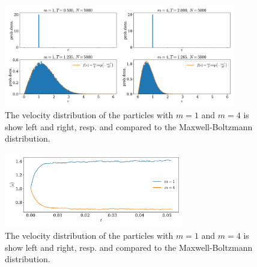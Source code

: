 \documentclass{article}
\begin{document}
            \begin{figure}
                \centering
                \includegraphics[width=0.9\textwidth]{../plots/problem2/vel_dist.pdf}
                \caption{The velocity distribution of the particles with $m=1$ and $m=4$ is show left and right, resp. and compared to the Maxwell-Boltzmann distribution.}
                \label{problem2 dist}
            \end{figure}
            \begin{figure}[h]
                \centering
                \includegraphics[width=0.7\textwidth]{../plots/problem2/v_av.pdf}
                \caption{The velocity distribution of the particles with $m=1$ and $m=4$ is show left and right, resp. and compared to the Maxwell-Boltzmann distribution.}
                \label{problem2 av vel}
            \end{figure}
\end{document}

